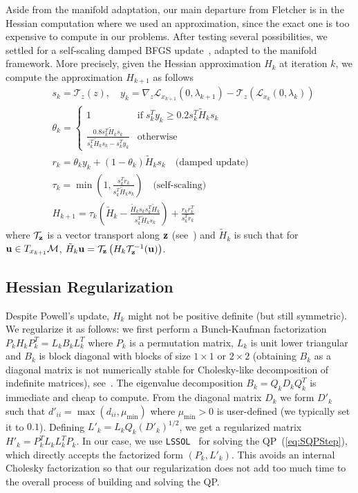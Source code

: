 Aside from the manifold adaptation, our main departure from Fletcher is in the Hessian computation where we used an approximation, since the exact one is too expensive to compute in our problems.
After testing several possibilities, we settled for a self-scaling damped BFGS update~\cite{nocedal:mp:1993,nocedal:book:2006}, adapted to the manifold framework.
More precisely, given the Hessian approximation $H_k$ at iteration $k$, we compute the approximation $H_{k+1}$ as follows
\begin{align}
  &s_k = \mathcal{T}_z(z), \quad y_k = \nabla_z \mathcal{L}_{x_{k+1}}(0,\lambda_{k+1}) - \mathcal{T}_z(\mathcal{L}_{x_{k}}(0,\lambda_{k})) \nonumber\\
  &\theta_k = \left\{\begin{array}{ll}
    1 & \mbox{if} \; s_k^T y_k \geq 0.2 s_k^T \tilde{H}_k s_k \\
    \frac{0.8 s_k^T \tilde{H}_k s_k}{s_k^T \tilde{H}_k s_k - s_k^T y_k} & \mbox{otherwise}
  \end{array}\right. \nonumber\\
  &r_k = \theta_k y_k + \left(1-\theta_k\right) \tilde{H}_k s_k \quad \mbox{(damped update)} \nonumber\\
  &\tau_k = \min\left(1, \frac{s_k^T r_k}{s_k^T \tilde{H}_k s_k} \right) \quad \mbox{(self-scaling)} \nonumber\\
  &H_{k+1} = \tau_k \left(\tilde{H}_k-\frac{\tilde{H}_k s_k s_k^T \tilde{H}_k}{s_k^T \tilde{H}_k s_k} \right) + \frac{r_k r_k^T}{s_k^T r_k} \nonumber%
\end{align}
where $\mathcal{T}_{\bf z}$ is a vector transport along ${\bf z}$ (see~\cite{absil:book:2008}) and $\tilde{H}_k$ is such that for ${\bf u} \in T_{x_{k+1}} \mathcal{M}$, $\tilde{H}_k {\bf u} = \mathcal{T}_{\bf z}\left(H_k \mathcal{T}_{\bf z}^{-1}({\bf u}) \right)$.

\subsection{Hessian Regularization}
\label{sub:hessian_regularization}

Despite Powell's update, $H_{k}$ might not be positive definite (but still symmetric).
We regularize it as follows: we first perform a Bunch-Kaufman factorization $P_k H_k P_k^T= L_k B_k L_k^T$ where $P_k$ is a permutation matrix, $L_k$ is unit lower triangular and $B_k$ is block diagonal with blocks of size $1 \times 1$ or $2\times 2$ (obtaining $B_k$ as a diagonal matrix is not numerically stable for Cholesky-like decomposition of indefinite matrices), see~\cite{golub:book:1996}.
The eigenvalue decomposition $B_k = Q_k D_k Q_k^T$ is immediate and cheap to compute.
From the diagonal matrix $D_k$ we form $D'_k$ such that $d'_{ii} = \max\left(d_{ii},\mu_{\min}\right)$ where $\mu_{\min}>0$ is user-defined (we typically set it to $0.1$).
Defining $L'_k = L_k Q_k {(D'_k)}^{1/2}$, we get a regularized matrix $H'_k = P_k^T L_k L_k^T P_k$.
In our case, we use {\tt LSSOL}~\cite{gill:techrep:1986} for solving the QP~(\ref{eq:SQPStep}), which directly accepts the factorized form $(P_k, L'_k)$.
This avoids an internal Cholesky factorization so that our regularization does not add too much time to the overall process of building and solving the QP.\@

